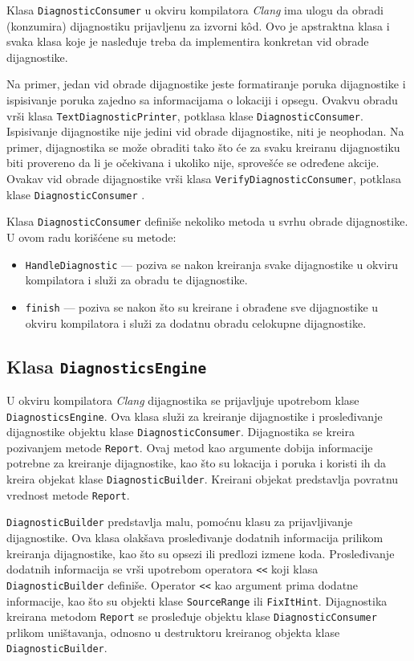 \documentclass[12pt,oneside]{memoir}
\begin{document}
Klasa \texttt{DiagnosticConsumer} u okviru kompilatora \textit{Clang} ima ulogu da obradi (konzumira) dijagnostiku prijavljenu
za izvorni k\^{o}d. Ovo je apstraktna klasa i svaka klasa koje je nasleđuje treba da implementira konkretan vid obrade dijagnostike. \par
Na primer, jedan vid obrade dijagnostike jeste formatiranje poruka dijagnostike i ispisivanje poruka zajedno sa informacijama o lokaciji i opsegu.
Ovakvu obradu vr\v{s}i klasa \texttt{TextDiagnosticPrinter}, potklasa klase \texttt{DiagnosticConsumer}.
Ispisivanje dijagnostike nije jedini vid obrade dijagnostike, niti je neophodan. Na primer, dijagnostika se mo\v{z}e obraditi
tako \v{s}to \'{c}e za svaku kreiranu dijagnostiku biti provereno da li je o\v{c}ekivana i ukoliko nije, sprove\v{s}\'{c}e se određene akcije.
Ovakav vid obrade dijagnostike vr\v{s}i klasa \texttt{VerifyDiagnosticConsumer}, potklasa klase \texttt{DiagnosticConsumer} \cite{CFEWebsite}.

Klasa \texttt{DiagnosticConsumer} defini\v{s}e nekoliko metoda u svrhu obrade dijagnostike. U ovom radu kori\v{s}\'{c}ene su metode:
\begin{itemize}
\item \texttt{HandleDiagnostic} --- poziva se nakon kreiranja svake dijagnostike u okviru kompilatora i slu\v{z}i za obradu te dijagnostike. 
\item \texttt{finish} --- poziva se nakon \v{s}to su kreirane i obrađene sve dijagnostike u okviru kompilatora i slu\v{z}i za dodatnu obradu celokupne dijagnostike.
\end{itemize}

\subsection{Klasa \texttt{DiagnosticsEngine}}

U okviru kompilatora \textit{Clang} dijagnostika se prijavljuje upotrebom klase \texttt{Diagno\-sticsEngine}. Ova klasa slu\v{z}i 
za kreiranje dijagnostike i prosleđivanje dijagnostike objektu klase \texttt{DiagnosticConsumer}. Dijagnostika se kreira pozivanjem metode \texttt{Report}. Ovaj metod kao argumente dobija informacije potrebne za kreiranje dijagnostike, kao \v{s}to su lokacija i poruka i koristi ih da kreira objekat klase \texttt{DiagnosticBuilder}. Kreirani objekat predstavlja povratnu vrednost metode \texttt{Report}. \par
\texttt{DiagnosticBuilder} predstavlja malu, pomo\'{c}nu klasu za prijavljivanje dijagnostike. Ova klasa olak\v{s}ava prosleđivanje
dodatnih informacija prilikom kreiranja dijagnostike, kao \v{s}to su opsezi ili predlozi izmene koda. Prosleđivanje dodatnih informacija se vr\v{s}i upotrebom operatora \texttt{<<} koji klasa \texttt{DiagnosticBuilder} defini\v{s}e. Operator \texttt{<<} kao argument prima dodatne informacije, kao \v{s}to su objekti klase \texttt{SourceRange} ili \texttt{FixItHint}. Dijagnostika kreirana metodom
\texttt{Report} se prosleđuje objektu klase \texttt{DiagnosticConsumer} prlikom uni\v{s}tavanja, odnosno u destruktoru kreiranog objekta klase \texttt{DiagnosticBuilder}. 
\end{document}
